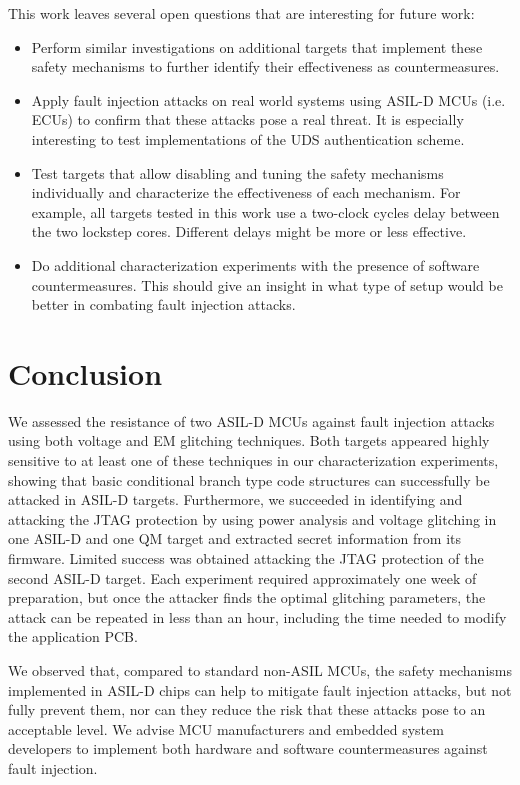 \documentclass[a4paper, 10pt]{IEEEtran}
\begin{document}
This work leaves several open questions that are interesting for future work:

\begin{itemize}
	\item Perform similar investigations on additional targets that implement these safety mechanisms to further identify their effectiveness as countermeasures.
    \item Apply fault injection attacks on real world systems using ASIL-D MCUs (i.e. ECUs) to confirm that these attacks pose a real threat. It is especially interesting to test implementations of the UDS authentication scheme. 
    \item Test targets that allow disabling and tuning the safety mechanisms individually and characterize the effectiveness of each mechanism. For example, all targets tested in this work use a two-clock cycles delay between the two lockstep cores. Different delays might be more or less effective.
    \item Do additional characterization experiments with the presence of software countermeasures. This should give an insight in what type of setup would be better in combating fault injection attacks.
\end{itemize}

\section{Conclusion}
We assessed the resistance of two ASIL-D MCUs against fault injection attacks using both voltage and EM glitching techniques. Both targets appeared highly sensitive to at least one of these techniques in our characterization experiments, showing that basic conditional branch type code structures can successfully be attacked in ASIL-D targets. Furthermore, we succeeded in identifying and attacking the JTAG protection by using power analysis and voltage glitching in one ASIL-D and one QM target and extracted secret information from its firmware. Limited success was obtained attacking the JTAG protection of the second ASIL-D target. Each experiment required approximately one week of preparation, but once the attacker finds the optimal glitching parameters, the attack can be repeated in less than an hour, including the time needed to modify the application PCB.

We observed that, compared to standard non-ASIL MCUs, the safety mechanisms implemented in ASIL-D chips can help to mitigate fault injection attacks, but not fully prevent them, nor can they reduce the risk that these attacks pose to an acceptable level. We advise MCU manufacturers and embedded system developers to implement both hardware and software countermeasures against fault injection.


\end{document}
